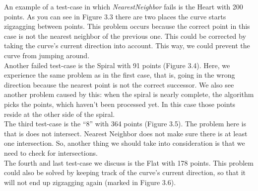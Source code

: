     \noindent An example of a test-case in which \textit{NearestNeighbor} fails is the Heart with 200 points. As you can see in Figure 3.3 there are two places the curve starts zigzagging between points.
    This problem occurs because the correct point in this case is not the nearest neighbor of the previous one. This could be corrected by taking the curve's current direction into account. This way, we could prevent the curve from jumping around.\\
    \noindent Another failed test-case is the Spiral with 91 points (Figure 3.4). Here, we experience the same problem as in the first case, that is, going in the wrong direction because the nearest point is not the correct successor. We also see another problem caused by this: when the spiral is nearly complete, the algorithm picks the points, which haven't been processed yet. In this case those points reside at the other side of the spiral.\\
    \noindent The third test-case is the ``8'' with 364 points (Figure 3.5). The problem here is that is does not intersect. Nearest Neighbor does not make sure there is at least one intersection. So, another thing we should take into consideration is that we need to check for intersections. \\
    \noindent The fourth and last test-case we discuss is the Flat with 178 points. This problem could also be solved by keeping track of the curve's current direction, so that it will not end up zigzagging again (marked in Figure 3.6).\\\\
